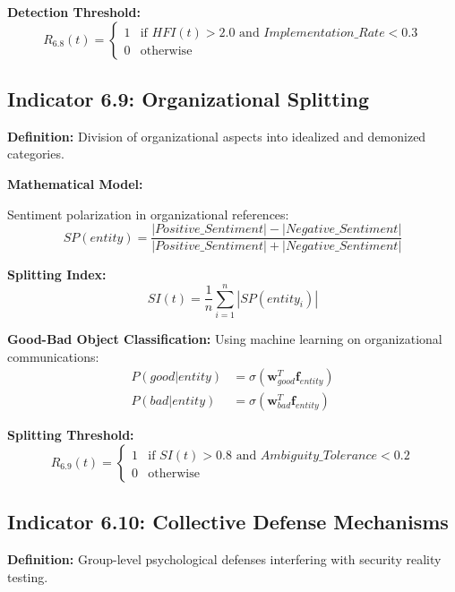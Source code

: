 \documentclass[11pt,a4paper]{article}
\begin{document}
\textbf{Detection Threshold:}
\begin{equation}
R_{6.8}(t) = \begin{cases}
1 & \text{if } HFI(t) > 2.0 \text{ and } Implementation\_Rate < 0.3 \\
0 & \text{otherwise}
\end{cases}
\end{equation}

\subsection{Indicator 6.9: Organizational Splitting}

\textbf{Definition:} Division of organizational aspects into idealized and demonized categories.

\textbf{Mathematical Model:}

Sentiment polarization in organizational references:
\begin{equation}
SP(entity) = \frac{|Positive\_Sentiment| - |Negative\_Sentiment|}{|Positive\_Sentiment| + |Negative\_Sentiment|}
\end{equation}

\textbf{Splitting Index:}
\begin{equation}
SI(t) = \frac{1}{n}\sum_{i=1}^n |SP(entity_i)|
\end{equation}

\textbf{Good-Bad Object Classification:}
Using machine learning on organizational communications:
\begin{align}
P(good|entity) &= \sigma(\mathbf{w}_{good}^T \mathbf{f}_{entity}) \\
P(bad|entity) &= \sigma(\mathbf{w}_{bad}^T \mathbf{f}_{entity})
\end{align}

\textbf{Splitting Threshold:}
\begin{equation}
R_{6.9}(t) = \begin{cases}
1 & \text{if } SI(t) > 0.8 \text{ and } Ambiguity\_Tolerance < 0.2 \\
0 & \text{otherwise}
\end{cases}
\end{equation}

\subsection{Indicator 6.10: Collective Defense Mechanisms}

\textbf{Definition:} Group-level psychological defenses interfering with security reality testing.
\end{document}
